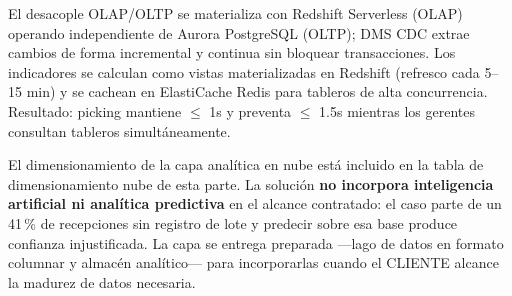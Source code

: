 El desacople OLAP/OLTP se materializa con Redshift Serverless (OLAP) operando independiente de Aurora PostgreSQL (OLTP); DMS CDC extrae cambios de forma incremental y continua sin bloquear transacciones. Los indicadores se calculan como vistas materializadas en Redshift (refresco cada 5--15 min) y se cachean en ElastiCache Redis para tableros de alta concurrencia. Resultado: picking mantiene $\leq$ 1s y preventa $\leq$ 1.5s mientras los gerentes consultan tableros simultáneamente.

El dimensionamiento de la capa analítica en nube está incluido en la tabla de dimensionamiento nube de esta parte. La solución \textbf{no incorpora inteligencia artificial ni analítica predictiva} en el alcance contratado: el caso parte de un 41\,\% de recepciones sin registro de lote y predecir sobre esa base produce confianza injustificada. La capa se entrega preparada ---lago de datos en formato columnar y almacén analítico--- para incorporarlas cuando el CLIENTE alcance la madurez de datos necesaria.
